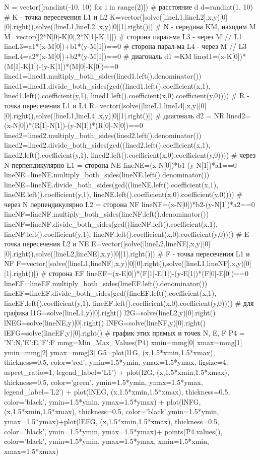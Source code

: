\documentclass[a4paper, 12pt]{article}
\begin{document}
\begin{sagesilent}
   N = vector([randint(-10, 10) for i in range(2)])
# расстояние d
d=randint(1, 10)
# K - точка пересечения L1 и L2
K=vector([solve([lineL1,lineL2],x,y)[0][0].right(),solve([lineL1,lineL2],x,y)[0][1].right()])
# N - середина KM, находим M
M=vector([2*N[0]-K[0],2*N[1]-K[1]])
# сторона парал-ма L3 - через M // L1
lineL3=a1*(x-M[0])+b1*(y-M[1])==0
# сторона парал-ма L4 - через M // L3
lineL4=a2*(x-M[0])+b2*(y-M[1])==0
# диагональ d1 =KM
lined1=(x-K[0])*(M[1]-K[1])-(y-K[1])*(M[0]-K[0])==0
lined1=lined1.multiply_both_sides(lined1.left().denominator())
lined1=lined1.divide_both_sides(gcd((lined1.left().coefficient(x,1), lined1.left().coefficient(y,1), lined1.left().coefficient(x,0).coefficient(y,0))))
# R - точка пересечения L1 и L4
R=vector([solve([lineL1,lineL4],x,y)[0][0].right(),solve([lineL1,lineL4],x,y)[0][1].right()])
# диагональ d2 = NR
lined2=(x-N[0])*(R[1]-N[1])-(y-N[1])*(R[0]-N[0])==0
lined2=lined2.multiply_both_sides(lined2.left().denominator())
lined2=lined2.divide_both_sides(gcd((lined2.left().coefficient(x,1), lined2.left().coefficient(y,1), lined2.left().coefficient(x,0).coefficient(y,0))))
# через N перпендикулярно L1 = сторона NE
lineNE=(x-N[0])*b1-(y-N[1])*a1==0
lineNE=lineNE.multiply_both_sides(lineNE.left().denominator())
lineNE=lineNE.divide_both_sides(gcd((lineNE.left().coefficient(x,1), lineNE.left().coefficient(y,1), lineNE.left().coefficient(x,0).coefficient(y,0))))
# через N перпендикулярно L2 = сторона NF
lineNF=(x-N[0])*b2-(y-N[1])*a2==0
lineNF=lineNF.multiply_both_sides(lineNF.left().denominator())
lineNF=lineNF.divide_both_sides(gcd((lineNF.left().coefficient(x,1), lineNF.left().coefficient(y,1), lineNF.left().coefficient(x,0).coefficient(y,0))))
# E - точка пересечения L2 и NE
E=vector([solve([lineL2,lineNE],x,y)[0][0].right(),solve([lineL2,lineNE],x,y)[0][1].right()])
# F - точка пересечения L1 и NF
F=vector([solve([lineL1,lineNF],x,y)[0][0].right(),solve([lineL1,lineNF],x,y)[0][1].right()])
# сторона EF
lineEF=(x-E[0])*(F[1]-E[1])-(y-E[1])*(F[0]-E[0])==0
lineEF=lineEF.multiply_both_sides(lineEF.left().denominator())
lineEF=lineEF.divide_both_sides(gcd((lineEF.left().coefficient(x,1), lineEF.left().coefficient(y,1), lineEF.left().coefficient(x,0).coefficient(y,0))))
# для графика
l1G=solve(lineL1,y)[0].right()
l2G=solve(lineL2,y)[0].right()
lNEG=solve(lineNE,y)[0].right()
lNFG=solve(lineNF,y)[0].right()
lEFG=solve(lineEF,y)[0].right()
# график этих прямых и точек N, E, F
P4 = {'N':N,'E':E,'F':F}
mmg=Min_Max_Values(P4)
xmin=mmg[0]
xmax=mmg[1]
ymin=mmg[2]
ymax=mmg[3]
G5=plot(l1G, (x,1.5*xmin,1.5*xmax), thickness=0.5, color='red', ymin=1.5*ymin, ymax=1.5*ymax, figsize=4, aspect_ratio=1, legend_label='L1') + plot(l2G, (x,1.5*xmin,1.5*xmax), thickness=0.5, color='green', ymin=1.5*ymin, ymax=1.5*ymax, legend_label='L2') + plot(lNEG, (x,1.5*xmin,1.5*xmax), thickness=0.5, color='black', ymin=1.5*ymin, ymax=1.5*ymax) + plot(lNFG, (x,1.5*xmin,1.5*xmax), thickness=0.5, color='black',ymin=1.5*ymin, ymax=1.5*ymax)+plot(lEFG, (x,1.5*xmin,1.5*xmax), thickness=0.5, color='black', ymin=1.5*ymin, ymax=1.5*ymax)+ points(P4.values(), color='black', ymin=1.5*ymin, ymax=1.5*ymax, xmin=1.5*xmin, xmax=1.5*xmax)

\end{sagesilent}
\end{document}
